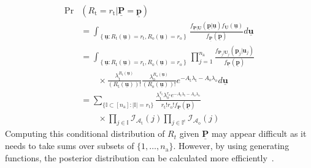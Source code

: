 \begin{equation*}
\begin{split}
\Pr & \left( R_{\mathrm{t}} = r_{\mathrm{t}}
| \underline{\mathbf{P}} = \underline{\mathbf{p}} \right) \\
&= \int_{ \left\{ \underline{\mathbf{u}}
	: R_{\mathrm{t}}(\underline{\mathbf{u}}) = r_{\mathrm{t}},
	R_{\mathrm{o}}(\underline{\mathbf{u}}) = r_{\mathrm{o}} \right\} }
\frac{ f_{\underline{\mathbf{P}} | \underline{\mathbf{U}}}
	\left( \underline{\mathbf{p}} | \underline{\mathbf{u}} \right)
	f_{\underline{\mathbf{U}}} (\underline{\mathbf{u}}) }
{ f_{\underline{\mathbf{P}}} \left( \underline{\mathbf{p}} \right) }
d\underline{\mathbf{u}} \\
&= \int_{ \left\{ \underline{\mathbf{u}}
	: R_{\mathrm{t}}(\underline{\mathbf{u}}) = r_{\mathrm{t}},
	R_{\mathrm{o}}(\underline{\mathbf{u}}) = r_{\mathrm{o}} \right\} }
\prod_{j=1}^{n_{\mathrm{a}}} \frac{ f_{\mathbf{P}_j | \mathbf{U}_j}
	(\mathbf{p}_{j}|\mathbf{u}_j) }
{f_{\underline{\mathbf{P}}}(\underline{\mathbf{p}})} \\
&\qquad \times
\frac{ \lambda_{\mathrm{t}}^{R_{\mathrm{t}}(\underline{\mathbf{u}})} }
{ ( R_{\mathrm{t}}(\underline{\mathbf{u}}) )! }
\frac{ \lambda_{\mathrm{o}}^{R_{\mathrm{o}}(\underline{\mathbf{u}})} }
{ ( R_{\mathrm{o}}(\underline{\mathbf{u}}) )! }
e^{- A_{\mathrm{t}} \lambda_{\mathrm{t}}
	- A_{\mathrm{o}} \lambda_{\mathrm{o}}}
d\underline{\mathbf{u}} \\
&= \sum_{\{ \mathbb{I} \subset [n_{\mathrm{a}}]
	: |\mathbb{I}| = r_{\mathrm{t}} \}}
\frac{\lambda_{\mathrm{t}}^{r_{\mathrm{t}}}
	\lambda_{\mathrm{o}}^{r_{\mathrm{o}}}
	e^{- A_{\mathrm{t}} \lambda_{\mathrm{t}}
		- A_{\mathrm{o}} \lambda_{\mathrm{o}}}}
{r_{\mathrm{t}}! r_{\mathrm{o}}!
	f_{\underline{\mathbf{P}}}(\underline{\mathbf{p}})} \\
&\qquad \times
\prod_{j \in \mathbb{I}} \mathcal{I}_{\mathcal{A}_{\mathrm{t}}}(j)
\prod_{j \in \mathbb{I}^{\mathrm{c}}} \mathcal{I}_{\mathcal{A}_{\mathrm{o}}}(j)
\end{split}
\end{equation*}
Computing this conditional distribution of $R_{t}$ given $\underline{\mathbf{P}}$ may appear difficult as it needs to take sums over subsets of $\{ 1, \ldots, n_{\mathrm{a}} \}$. However, by using generating functions, the posterior distribution can be calculated more efficiently~\cite{graham1994concrete}.

